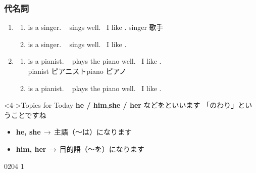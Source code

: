 \documentclass[aspectratio=169,xcolor={dvipsnames,table}]{beamer}
\begin{document}
\begin{frame}[plain]\frametitle{代名詞}
\begin{enumerate}
 \item \begin{enumerate}
	\item<1->  is a singer.\,\,\,\,\, sings well.\,\,\,\,\,I like .%
\hfill{\scriptsize singer  歌手}
	\item<2->  is a singer.\,\,\,\,\, sings well.\,\,\,\,\,I like .
       \end{enumerate}
 \item \begin{enumerate}
	\item<1->  is a pianist.\,\,\,\,\, plays the piano well.\,\,\,\,\,I like .\\%
\hfill{\scriptsize pianist  ピアニスト\hspace{1\zw}piano  ピアノ}
	\item<3->  is a pianist.\,\,\,\,\, plays the piano well.\,\,\,\,\,I like . 
       \end{enumerate}
\end{enumerate}

\vfill

\begin{block}<4->{Topics for Today}
\textbf{he / him},\hspace{8pt}\textbf{she / her} などをといいます%
\hfill{}{\scriptsize 「のわり」ということですね}
\begin{itemize}[circle]
 \item<5-> \textbf{he, she}\,$\longrightarrow$\,主語（～は）になります\hfill{}\hspace{80pt}\mbox{}
 \item<6-> \textbf{him, her}\,$\longrightarrow$\,目的語（～を）になります\hfill{}\hspace{80pt}\mbox{}
\end{itemize}
     \end{block}

\hfill{\tiny 0204}\,{\scriptsize {}\,1}
\end{frame}
\end{document}
